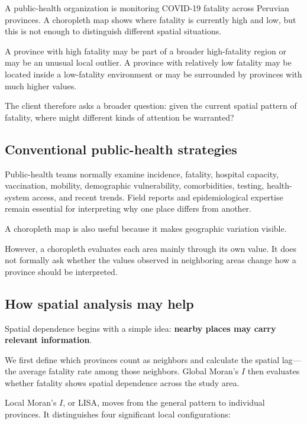 \documentclass[11pt]{article}
\begin{document}
\begin{executivebox}
A public-health organization is monitoring COVID-19 fatality across Peruvian provinces. A choropleth map shows where fatality is currently high and low, but this is not enough to distinguish different spatial situations.

A province with high fatality may be part of a broader high-fatality region or may be an unusual local outlier. A province with relatively low fatality may be located inside a low-fatality environment or may be surrounded by provinces with much higher values.

The client therefore asks a broader question: given the current spatial pattern of fatality, where might different kinds of attention be warranted?
\end{executivebox}

\subsection{Conventional public-health strategies}

Public-health teams normally examine incidence, fatality, hospital capacity, vaccination, mobility, demographic vulnerability, comorbidities, testing, health-system access, and recent trends. Field reports and epidemiological expertise remain essential for interpreting why one place differs from another.

A choropleth map is also useful because it makes geographic variation visible.

However, a choropleth evaluates each area mainly through its own value. It does not formally ask whether the values observed in neighboring areas change how a province should be interpreted.

\subsection{How spatial analysis may help}

Spatial dependence begins with a simple idea: \textbf{nearby places may carry relevant information}.

We first define which provinces count as neighbors and calculate the spatial lag---the average fatality rate among those neighbors. Global Moran's \(I\) then evaluates whether fatality shows spatial dependence across the study area.

Local Moran's \(I\), or LISA, moves from the general pattern to individual provinces. It distinguishes four significant local configurations:
\end{document}
